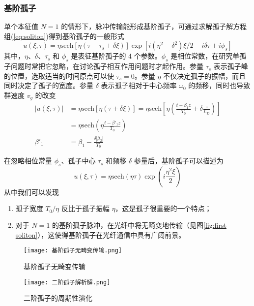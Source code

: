 \subsubsection{基阶孤子}
单个本征值 $N=1$ 的情形下，脉冲传输能形成基阶孤子，可通过求解孤子解方程组(\ref{eq:soliton})得到基阶孤子的一般形式
\begin{equation}
    u(\xi,\tau)=\eta\mathrm{sech}[\eta(\tau-\tau_s+\delta\xi)]\exp[i(\eta^2-\delta^2)\xi/2-i\delta\tau+i\phi_s]
\end{equation}
其中，$\eta$、$\delta$、$\tau_s$ 和 $\phi_s$ 是表征基阶孤子的 4 个参数。$\phi_s$ 是相位常数，在研究单孤子问题时常把它忽略，在讨论孤子相互作用问题时才起作用。参量 $\tau_s$ 表示孤子峰的位置，选取适当的时间原点可以使 $\tau_s=0$。参量 $\eta$ 不仅决定孤子的振幅，而且同时决定了孤子的宽度。参量 $\delta$ 表示孤子相对于中心频率 $\omega_0$ 的频移，同时也导致群速度 $v_g$ 的改变\cite{Agrawal}
\begin{equation}
    \begin{aligned}
        |u(\xi,\tau)|&=\eta\mathrm{sech}[\eta(\tau+\delta\xi)]=\eta\mathrm{sech}\left[\eta\left(\frac{t-\beta_1z}{T_0}+\delta\frac{z}{L_D}\right)\right]\\
        &=\eta\mathrm{sech}\left(\eta\frac{t-\beta'_1z}{T_0}\right)\\
        \beta'_1&=\beta_1-\frac{\delta|\beta_2|}{T_0}
    \end{aligned}
\end{equation}

在忽略相位常量 $\phi_s$、孤子中心 $\tau_s$ 和频移 $\delta$ 参量后，基阶孤子可以描述为
\begin{equation}
    u(\xi,\tau)=\eta\mathrm{sech}(\eta\tau)\exp\left(i\frac{\eta^2\xi}{2}\right)
\end{equation}
从中我们可以发现
\begin{enumerate}[label=(\arabic*)]
    \item 孤子宽度 $T_0/\eta$ 反比于孤子振幅 $\eta$，这是孤子很重要的一个特点；
    \item 对于 $N=1$ 的基阶孤子脉冲，在光纤中将无畸变地传输（见图\ref{fig:first soliton}），这使得基阶孤子在光纤通信中具有广阔前景。
\end{enumerate}
\begin{figure}[bp]
    \centering
    \begin{minipage}[t]{0.45\linewidth}
        \centering
        \texttt{[image: 基阶孤子无畸变传输.png]}
        \caption{基阶孤子无畸变传输}
        \label{fig:first soliton}
    \end{minipage}       
    \begin{minipage}[t]{0.45\linewidth}
        \centering
        \texttt{[image: 二阶孤子解析解.png]}
        \caption{二阶孤子的周期性演化}
        \label{fig:second soliton}    
    \end{minipage}
\end{figure}
